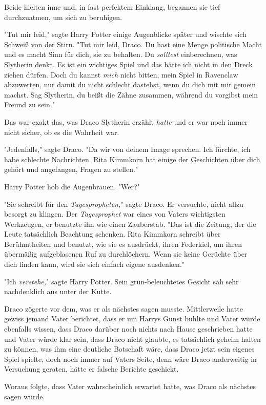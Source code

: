 {Beide hielten inne und, in fast perfektem Einklang, begannen sie tief durchzuatmen, um sich zu beruhigen.

"Tut mir leid," sagte Harry Potter einige Augenblicke später und wischte sich Schweiß von der Stirn. "Tut mir leid, Draco. Du hast eine Menge politische Macht und es macht Sinn für dich, sie zu behalten. Du \emph{solltest} einberechnen, was Slytherin denkt. Es ist ein wichtiges Spiel und das hätte ich nicht in den Dreck ziehen dürfen. Doch du kannst \emph{mich} nicht bitten, mein Spiel in Ravenclaw abzuwerten, nur damit du nicht schlecht dastehst, wenn du dich mit mir gemein machst. Sag Slytherin, du beißt die Zähne zusammen, während du vorgibst mein Freund zu sein."

Das war exakt das, was Draco Slytherin erzählt \emph{hatte} und er war noch immer nicht sicher, ob es die Wahrheit war.

"Jedenfalls," sagte Draco. "Da wir von deinem Image sprechen. Ich fürchte, ich habe schlechte Nachrichten. Rita Kimmkorn hat einige der Geschichten über dich gehört und angefangen, Fragen zu stellen."

Harry Potter hob die Augenbrauen. "Wer?"

"Sie schreibt für den \emph{Tagespropheten,}" sagte Draco. Er versuchte, nicht allzu besorgt zu klingen. Der \emph{Tagesprophet} war eines von Vaters wichtigsten Werkzeugen, er benutzte ihn wie einen Zauberstab. "Das ist die Zeitung, der die Leute tatsächlich Beachtung schenken. Rita Kimmkorn schreibt über Berühmtheiten und benutzt, wie sie es ausdrückt, ihren Federkiel, um ihren übermäßig aufgeblasenen Ruf zu durchlöchern. Wenn sie keine Gerüchte über dich finden kann, wird sie sich einfach eigene ausdenken."

"Ich \emph{verstehe,}" sagte Harry Potter. Sein grün-beleuchtetes Gesicht sah sehr nachdenklich aus unter der Kutte.

Draco zögerte vor dem, was er als nächstes sagen musste. Mittlerweile hatte gewiss jemand Vater berichtet, dass er um Harrys Gunst buhlte und Vater würde ebenfalls wissen, dass Draco darüber noch nichts nach Hause geschrieben hatte und Vater würde klar sein, dass Draco nicht glaubte, es tatsächlich geheim halten zu können, was ihm eine deutliche Botschaft wäre, dass Draco jetzt sein eigenes Spiel spielte, doch noch immer auf Vaters Seite, denn wäre Draco anderweitig in Versuchung geraten, hätte er falsche Berichte geschickt.

Woraus folgte, dass Vater wahrscheinlich erwartet hatte, was Draco als nächstes sagen würde.

}

